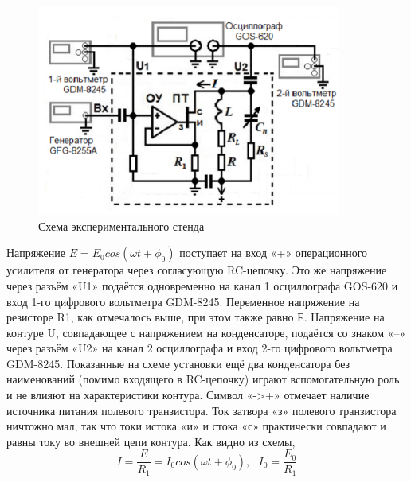 \documentclass[a4paper]{article}
\begin{document}
\begin{figure}[h]
    \centering
    \includegraphics[width=10cm]{fig1.PNG}
    \caption{Схема экспериментального стенда}
    \label{fig:vac}
\end{figure}

Напряжение $ E = E_0cos(\omega t + \phi_0) $ поступает на вход «+» операционного усилителя от генератора через согласующую RC-цепочку. Это же напряжение через разъём «U1» подаётся одновременно на канал 1 осциллографа GOS-620 и вход 1-го цифрового вольтметра GDM-8245. Переменное напряжение на резисторе R1, как отмечалось выше, при этом также равно Е. Напряжение на контуре U, совпадающее с напряжением на конденсаторе, подаётся со знаком «–» через разъём «U2» на канал 2 осциллографа и вход 2-го цифрового вольтметра GDM-8245. Показанные на схеме установки ещё два конденсатора без наименований (помимо входящего в RC-цепочку) играют вспомогательную роль и не влияют на характеристики контура. Символ «->+» отмечает наличие источника питания полевого транзистора. Ток затвора «з» полевого транзистора ничтожно мал, так что токи истока «и» и стока «с» практически совпадают и равны току во внешней цепи контура. Как видно из схемы, \[ I = \frac{E}{R_1} = I_0cos(\omega t + \phi_0), \:\:\: I_0 = \frac{E_0}{R_1} \]
\end{document}
